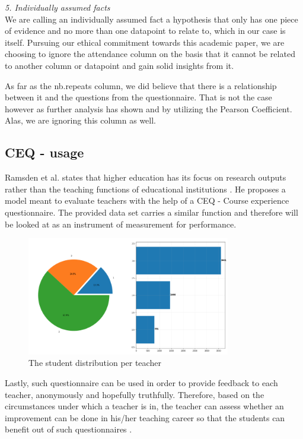 \documentclass[twocolumn]{article}
\begin{document}
\emph{5. Individually assumed facts} \\

We are calling an individually assumed fact a hypothesis that only has one piece of evidence and no more than one datapoint to relate to, which in our case is itself. Pursuing our ethical commitment towards this academic paper, we are choosing to ignore the attendance column on the basis that it cannot be related to another column or datapoint and gain solid insights from it.

As far as the nb.repeats column, we did believe that there is a relationship between it and the questions from the questionnaire. That is not the case however as further analysis has shown and by utilizing the Pearson Coefficient. Alas, we are ignoring this column as well.

    \subsection{CEQ - usage}
Ramsden et al. states that higher education has its focus on research outputs rather than the teaching functions of educational institutions \cite{Ramsden1991}. He proposes a model meant to evaluate teachers with the help of a CEQ - Course experience questionnaire. The provided data set carries a similar function and therefore will be looked at as an instrument of measurement for performance. 

\begin{figure}[hbt!]
  \centering
  \includegraphics[width=3.5in]{teach_dist.png}
  \caption{The student distribution per teacher}
\end{figure}

Lastly, such questionnaire can be used in order to provide feedback to each teacher, anonymously and hopefully truthfully. Therefore, based on the circumstances under which a teacher is in, the teacher can assess whether an improvement can be done in his/her teaching career so that the students can benefit out of such questionnaires \cite{Kember2009}.
\end{document}
